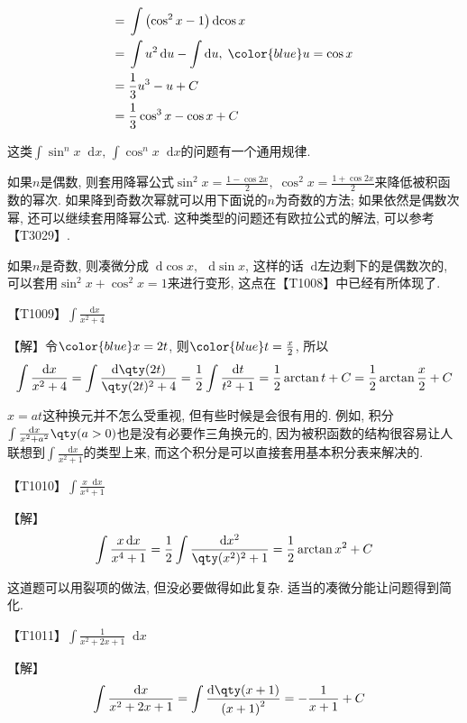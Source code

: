 \documentclass{ctexbook}
\newcommand*{\dif}{\mathop{}\!\mathrm{d}}
\begin{document}
{\begin{align*}
={}&\int\left(\cos^{2}{x}-1\right)\dif{\cos{x}}\\
={}&\int u^{2}\dif{u}-\int\dif{u},\;{\color{blue}u=\cos{x}}\\
={}&\frac{1}{3}u^{3}-u+C\\
={}&\frac{1}{3}\cos^{3}{x}-\cos{x}+C
\end{align*}\par
{\kaishu 这类$\int\sin^{n}{x}\dif{x},\,\int\cos^{n}{x}\dif{x}$的问题有一个通用规律. \par
如果$n$是偶数, 则套用降幂公式$\sin^{2}{x}=\frac{1-\cos{2x}}{2},\;\cos^{2}{x}=\frac{1+\cos{2x}}{2}$来降低被积函数的幂次. 如果降到奇数次幂就可以用下面说的$n$为奇数的方法; 如果依然是偶数次幂, 还可以继续套用降幂公式. 这种类型的问题还有欧拉公式的解法, 可以参考{\color{red}【T3029】}. \par
如果$n$是奇数, 则凑微分成$\dif{\cos{x}},\,\dif{\sin{x}}$, 这样的话$\dif$左边剩下的是偶数次的, 可以套用$\sin^{2}{x}+\cos^{2}{x}=1$来进行变形, 这点在{\color{red}【T1008】}中已经有所体现了. \par}
{\color{red}【T1009】}$\int\frac{\dif{x}}{x^{2}+4}$\par
【解】令$\color{blue}x=2t$, 则$\color{blue}t=\frac{x}{2}$, 所以
\begin{align*}
\int\frac{\dif{x}}{x^{2}+4}=\int\frac{\dif{\qty(2t)}}{\qty(2t)^{2}+4}=\frac{1}{2}\int\frac{\dif{t}}{t^{2}+1}=\frac{1}{2}\arctan{t}+C=\frac{1}{2}\arctan{\frac{x}{2}}+C
\end{align*}\par
{\kaishu $x=at$这种换元并不怎么受重视, 但有些时候是会很有用的. 例如, 积分$\int\frac{\dif{x}}{x^{2}+a^{2}}\qty(a>0)$也是没有必要作三角换元的, 因为被积函数的结构很容易让人联想到$\int\frac{\dif{x}}{x^{2}+1}$的类型上来, 而这个积分是可以直接套用基本积分表来解决的. \par}
{\color{red}【T1010】}$\int\frac{x\dif{x}}{x^{4}+1}$\par
【解】
\begin{align*}
\int\frac{x\dif{x}}{x^{4}+1}=\frac{1}{2}\int\frac{\dif{x^{2}}}{\qty(x^{2})^{2}+1}=\frac{1}{2}\arctan{x^{2}}+C
\end{align*}\par
{\kaishu 这道题可以用裂项的做法, 但没必要做得如此复杂. 适当的凑微分能让问题得到简化. \par}
{\color{red}【T1011】}$\int\frac{1}{x^{2}+2x+1}\dif{x}$\par
【解】
\begin{align*}
&\int\frac{\dif{x}}{x^{2}+2x+1}=\int\frac{\dif{\qty(x+1)}}{\left(x+1\right)^{2}}=-\frac{1}{x+1}+C

\end{align*}}
\end{document}
